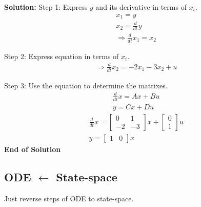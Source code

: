 \begin{multicols}{2}
\textbf{Solution:}\newline
Step 1: Express $y$ and its derivative in terms of $x_i$.
\begin{align*}
    & x_1 = y \\
    & x_2 = \frac{d}{dt}y \\
    &\Rightarrow \frac{d}{dt}x_1 = x_2
\end{align*}

Step 2: Express equation in terms of $x_i$.
\begin{align*}
    &\Rightarrow \frac{d}{dt}x_2 = -2x_1 - 3x_2 + u
\end{align*}

Step 3: Use the equation to determine the matrixes.
\begin{align*}
   &\frac{d}{dt}x = Ax + Bu  \\
   &y = Cx + Du 
\end{align*}
\begin{align*}
   &\frac{d}{dt}x = \begin{bmatrix} 0 & 1 \\ -2 & -3 \end{bmatrix}x + \begin{bmatrix} 0 \\ 1 \end{bmatrix}u  \\
   &y = \begin{bmatrix} 1 & 0 \end{bmatrix} x
\end{align*}
\textbf{End of Solution}


\subsection{ODE $\leftarrow$ State-space}
Just reverse steps of ODE to state-space.



\end{multicols}
